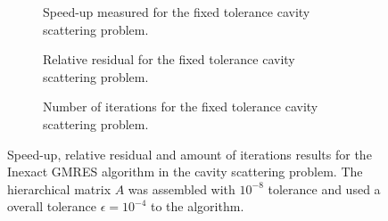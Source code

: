 \begin{figure}[h!]
    \centering
    \begin{subfigure}[b]{0.6\linewidth}
        
        \caption{Speed-up measured for the fixed tolerance cavity scattering problem.}
    \end{subfigure}
    \begin{subfigure}[b]{0.4\linewidth}
        
        \caption{Relative residual for the fixed tolerance cavity scattering problem.}
    \end{subfigure}
    \begin{subfigure}[b]{0.4\linewidth}
        
        \caption{Number of iterations for the fixed tolerance cavity scattering problem.}
    \end{subfigure}
    \caption{Speed-up, relative residual and amount of iterations results for the Inexact GMRES algorithm in the cavity scattering problem. The hierarchical matrix $A$ was assembled with $10^{-8}$ tolerance and used a overall tolerance $\epsilon = 10^{-4}$ to the algorithm.}
    \label{fig:cavity_resultsfixtol}
\end{figure}
